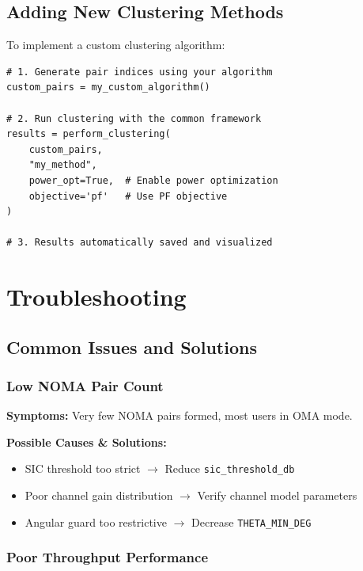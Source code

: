 \documentclass[12pt,a4paper]{article}
\newcommand{\code}[1]{\texttt{#1}}
\begin{document}
\subsection{Adding New Clustering Methods}

To implement a custom clustering algorithm:

\begin{lstlisting}[caption={Custom Method Template}]
# 1. Generate pair indices using your algorithm
custom_pairs = my_custom_algorithm()

# 2. Run clustering with the common framework
results = perform_clustering(
    custom_pairs, 
    "my_method",
    power_opt=True,  # Enable power optimization
    objective='pf'   # Use PF objective
)

# 3. Results automatically saved and visualized
\end{lstlisting}

\section{Troubleshooting}

\subsection{Common Issues and Solutions}

\subsubsection{Low NOMA Pair Count}

\textbf{Symptoms:} Very few NOMA pairs formed, most users in OMA mode.

\textbf{Possible Causes \& Solutions:}
\begin{itemize}
    \item SIC threshold too strict $\rightarrow$ Reduce \code{sic\_threshold\_db}
    \item Poor channel gain distribution $\rightarrow$ Verify channel model parameters
    \item Angular guard too restrictive $\rightarrow$ Decrease \code{THETA\_MIN\_DEG}
\end{itemize}

\subsubsection{Poor Throughput Performance}
\end{document}
